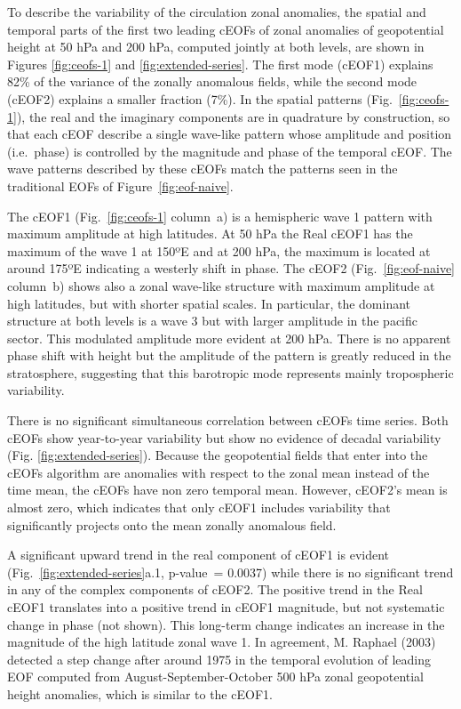 \documentclass[smallextended]{svjour3}       %
\begin{document}
To describe the variability of the circulation zonal anomalies, the spatial and temporal parts of the first two leading cEOFs of zonal anomalies of geopotential height at 50 hPa and 200 hPa, computed jointly at both levels, are shown in Figures \ref{fig:ceofs-1} and \ref{fig:extended-series}.
The first mode (cEOF1) explains 82\% of the variance of the zonally anomalous fields, while the second mode (cEOF2) explains a smaller fraction (7\%).
In the spatial patterns (Fig.~\ref{fig:ceofs-1}), the real and the imaginary components are in quadrature by construction, so that each cEOF describe a single wave-like pattern whose amplitude and position (i.e.~phase) is controlled by the magnitude and phase of the temporal cEOF.
The wave patterns described by these cEOFs match the patterns seen in the traditional EOFs of Figure~\ref{fig:eof-naive}.

The cEOF1 (Fig.~\ref{fig:ceofs-1} column~a) is a hemispheric wave 1 pattern with maximum amplitude at high latitudes.
At 50 hPa the Real cEOF1 has the maximum of the wave 1 at 150ºE and at 200 hPa, the maximum is located at around 175ºE indicating a westerly shift in phase.
The cEOF2 (Fig.~\ref{fig:eof-naive} column~b) shows also a zonal wave-like structure with maximum amplitude at high latitudes, but with shorter spatial scales.
In particular, the dominant structure at both levels is a wave 3 but with larger amplitude in the pacific sector.
This modulated amplitude more evident at 200 hPa.
There is no apparent phase shift with height but the amplitude of the pattern is greatly reduced in the stratosphere, suggesting that this barotropic mode represents mainly tropospheric variability.

There is no significant simultaneous correlation between cEOFs time series.
Both cEOFs show year-to-year variability but show no evidence of decadal variability (Fig. \ref{fig:extended-series}).
Because the geopotential fields that enter into the cEOFs algorithm are anomalies with respect to the zonal mean instead of the time mean, the cEOFs have non zero temporal mean.
However, cEOF2's mean is almost zero, which indicates that only cEOF1 includes variability that significantly projects onto the mean zonally anomalous field.

A significant upward trend in the real component of cEOF1 is evident (Fig.~\ref{fig:extended-series}a.1, p-value~= 0.0037) while there is no significant trend in any of the complex components of cEOF2.
The positive trend in the Real cEOF1 translates into a positive trend in cEOF1 magnitude, but not systematic change in phase (not shown).
This long-term change indicates an increase in the magnitude of the high latitude zonal wave 1.
In agreement, M. Raphael (2003) detected a step change after around 1975 in the temporal evolution of leading EOF computed from August-September-October 500 hPa zonal geopotential height anomalies, which is similar to the cEOF1.
\end{document}
